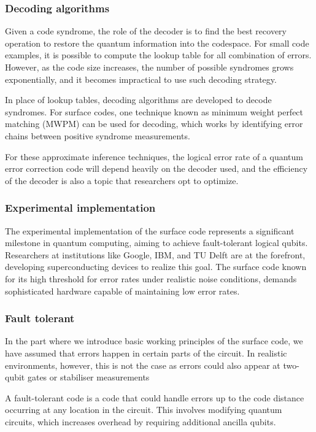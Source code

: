 \subsubsection{Decoding algorithms}
Given a code syndrome, the role of the decoder is to find the best recovery operation to restore the quantum information into the codespace. For small code examples, it is possible to compute the lookup table for all combination of errors. However, as the code size increases, the number of possible syndromes grows exponentially, and it becomes impractical to use such decoding strategy.

In place of lookup tables, decoding algorithms are developed to decode syndromes. For surface codes, one technique known as minimum weight perfect matching (MWPM) can be used for decoding, which works by identifying error chains between positive syndrome measurements.

For these approximate inference techniques, the logical error rate of a quantum error correction code will depend heavily on the decoder used, and the efficiency of the decoder is also a topic that researchers opt to optimize.

\subsubsection{Experimental implementation}
The experimental implementation of the surface code represents a significant milestone in quantum computing, aiming to achieve fault-tolerant logical qubits. Researchers at institutions like Google, IBM, and TU Delft are at the forefront, developing superconducting devices to realize this goal. The surface code known for its high threshold for error rates under realistic noise conditions, demands sophisticated hardware capable of maintaining low error rates.

\subsubsection{Fault tolerant}
In the part where we introduce basic working principles of the surface code, we have assumed that errors happen in certain parts of the circuit. In realistic environments, however, this is not the case as errors could also appear at two-qubit gates or stabiliser measurements

A fault-tolerant code is a code that could handle errors up to the code distance occurring at any location in the circuit. This involves modifying quantum circuits, which increases overhead by requiring additional ancilla qubits.
